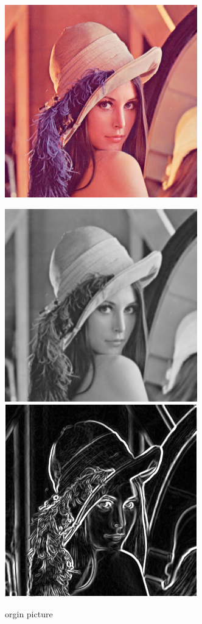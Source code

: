 \documentclass[10pt,twocolumn,letterpaper]{article}
\begin{document}
\begin{figure}[htp]
	\begin{center}
		\includegraphics[width=1\linewidth]{../../code/Lenna.jpg} \\ 
		\caption{orgin picture}
		\includegraphics[width=.473\linewidth]{../../code/cannyGuassianLena.png} \quad
		\includegraphics[width=.473\linewidth]{../../code/cannySobelLena.png} \\

\end{center}
\end{figure}
\end{document}
